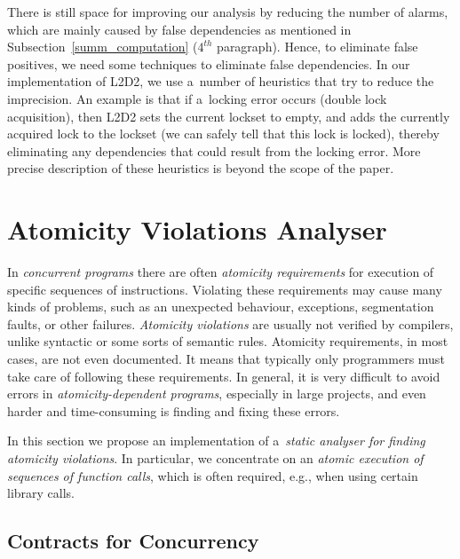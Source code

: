 \documentclass{ExcelAtFIT}
\begin{document}
There is still space for improving our analysis by reducing the number of alarms, which are mainly caused by false dependencies as mentioned in Subsection~\ref{summ_computation} ($4^{th}$ paragraph). Hence, to eliminate false positives, we need some techniques to eliminate false dependencies. In our implementation of L2D2, we use a~number of heuristics that try to reduce the imprecision. An example is that if a~locking error occurs (double lock acquisition), then L2D2 sets the current lockset to empty, and adds the currently acquired lock to the lockset (we can safely tell that this lock is locked), thereby eliminating any dependencies that could result from the locking error. More precise description of these heuristics is beyond the scope of the paper.

\section{Atomicity Violations Analyser}

In \emph{concurrent programs} there are often
\emph{atomicity requirements} for execution of specific
sequences of instructions. Violating these requirements
may cause many kinds of problems, such as an unexpected
behaviour, exceptions, segmentation faults, or other
failures. \emph{Atomicity violations} are usually not
verified by compilers, unlike syntactic or some sorts
of semantic rules. Atomicity requirements,
in most cases, are not even documented. It means
that typically only programmers must take care of
following these requirements. In general, it is very
difficult to avoid errors in \emph{atomicity-dependent
programs}, especially in large projects, and even harder
and time-consuming is finding and fixing these errors.

In this section we propose
an implementation of a~\emph{static analyser for
finding atomicity violations}. In particular,
we concentrate on an \emph{atomic execution
of sequences of function calls}, which is often
required, e.g., when using certain library calls.

\subsection{Contracts for Concurrency}
\label{sec:contracts}
\end{document}
